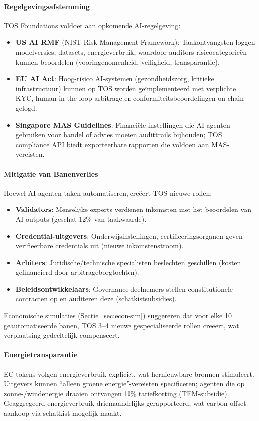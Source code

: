 \documentclass[11pt]{article}
\begin{document}
\paragraph{Regelgevingsafstemming} TOS Foundations voldoet aan opkomende AI-regelgeving:
\begin{itemize}[noitemsep]
  \item \textbf{US AI RMF} (NIST Risk Management Framework): Taakontvangsten loggen modelversies, datasets, energieverbruik, waardoor auditors risicocategorieën kunnen beoordelen (vooringenomenheid, veiligheid, transparantie).
  \item \textbf{EU AI Act}: Hoog-risico AI-systemen (gezondheidszorg, kritieke infrastructuur) kunnen op TOS worden geïmplementeerd met verplichte KYC, human-in-the-loop arbitrage en conformiteitsbeoordelingen on-chain gelogd.
  \item \textbf{Singapore MAS Guidelines}: Financiële instellingen die AI-agenten gebruiken voor handel of advies moeten audittrails bijhouden; TOS compliance API biedt exporteerbare rapporten die voldoen aan MAS-vereisten.
\end{itemize}

\paragraph{Mitigatie van Banenverlies} Hoewel AI-agenten taken automatiseren, creëert TOS nieuwe rollen:
\begin{itemize}[noitemsep]
  \item \textbf{Validators}: Menselijke experts verdienen inkomsten met het beoordelen van AI-outputs (geschat 12\% van taakwaarde).
  \item \textbf{Credential-uitgevers}: Onderwijsinstellingen, certificeringsorganen geven verifieerbare credentials uit (nieuwe inkomstenstroom).
  \item \textbf{Arbiters}: Juridische/technische specialisten beslechten geschillen (kosten gefinancierd door arbitrageborgtochten).
  \item \textbf{Beleidsontwikkelaars}: Governance-deelnemers stellen constitutionele contracten op en auditeren deze (schatkistsubsidies).
\end{itemize}
Economische simulaties (Sectie~\ref{sec:econ-sim}) suggereren dat voor elke 10 geautomatiseerde banen, TOS 3--4 nieuwe gespecialiseerde rollen creëert, wat verplaatsing gedeeltelijk compenseert.

\paragraph{Energietransparantie} EC-tokens volgen energieverbruik expliciet, wat hernieuwbare bronnen stimuleert. Uitgevers kunnen ``alleen groene energie''-vereisten specificeren; agenten die op zonne-/windenergie draaien ontvangen 10\% tariefkorting (TEM-subsidie). Geaggregeerd energieverbruik driemaandelijks gerapporteerd, wat carbon offset-aankoop via schatkist mogelijk maakt.
\end{document}
